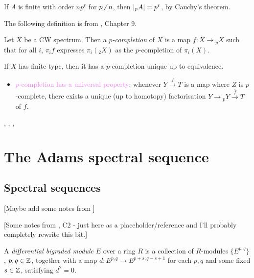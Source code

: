 \documentclass{MetricNotes2023}
\def\inte{\ensuremath\mathbb{Z}}
\def\textcolour{\textcolor}
\def\nvert{\ensuremath\hspace{-0.5ex}\not\vert\hspace{0.5ex}}
\begin{document}
\begin{remark}
If \(A\) is finite with order \(np^r\) for \(p\nvert n\), then \(\lvert\text{}_pA\rvert=p^r\), by Cauchy's theorem. 
\end{remark}

The following definition is from \autocite{spectra}, Chapter 9.

\begin{definition}
Let \(X\) be a CW spectrum. Then a \textit{\(p\)-completion} of \(X\) is a map \(f : X \to \text{}_pX\) such that for all \(i\), \(\pi_if\) expresses \(\pi_i(\text{}_2X)\) as the \(p\)-completion of \(\pi_i(X)\).
\end{definition}

\begin{theorem}
If \(X\) has finite type, then it has a \(p\)-completion unique up to equivalence. 
\end{theorem}

\begin{itemize}
\item \textcolour{violet}{\(p\)-completion has a universal property}: whenever \(Y \xrightarrow{f} T\) is a map where \(Z\) is \(p\)-complete, there exists a unique (up to homotopy) factorisation \(Y\to \text{}_pY \xrightarrow{\overline f} T\) of \(f\). 
\end{itemize}

\autocite{ass}, \autocite{hatcher5}, \autocite{concise}, \autocite{spectra}

\section{The Adams spectral sequence}

\subsection{Spectral sequences}\label{2504041910}

[Maybe add some notes from \autocite{ass}]

[Some notes from \autocite{spectral_sequences}, C2 - just here as a placeholder/reference and I'll probably completely rewrite this bit.]

\begin{definition}
A \textit{differential bigraded module} \(E\) over a ring \(R\) is a collection of \(R\)-modules \(\{E^{p, q}\}\), \(p, q\in \inte\), together with a map \(d : E^{p, q} \to E^{p+s, q-s+1}\) for each \(p, q\) and some fixed \(s \in \inte\), satisfying \(d^2=0\). 
\end{definition}
\end{document}
